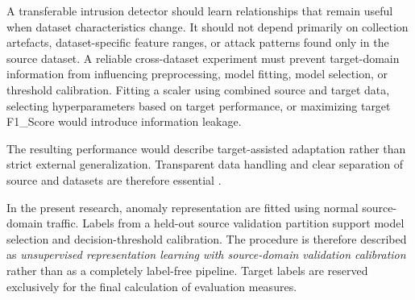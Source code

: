  A transferable intrusion detector should learn relationships that remain useful when dataset characteristics change. It should not depend 
 primarily on collection artefacts, dataset-specific feature ranges, or attack patterns found only in the source dataset. A reliable cross-dataset 
 experiment must prevent target-domain information from influencing preprocessing, model fitting, model selection, or threshold calibration. 
 Fitting a scaler using combined source and target data, selecting hyperparameters based on target performance, or maximizing target F1\_Score 
 would introduce information leakage.
 
 The resulting performance would describe target-assisted adaptation rather than strict external generalization. Transparent data handling and 
 clear separation of source and datasets are therefore essential \cite{Ring2019,Yang2022,Goldschmidt2025}.
 
 In the present research, anomaly representation are fitted using normal source-domain traffic. Labels from a held-out source validation partition 
 support model selection and decision-threshold calibration. The procedure is therefore described as \emph{unsupervised representation learning 
 with source-domain validation calibration} rather than as a completely label-free pipeline. Target labels are reserved exclusively for the final 
 calculation of evaluation measures.
 

